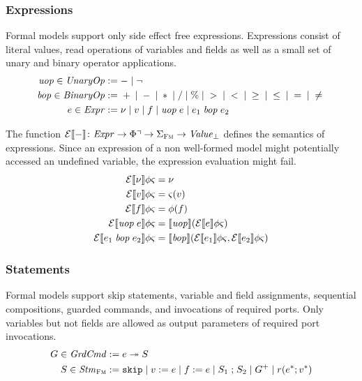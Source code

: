 \documentclass[a4paper,10pt,english]{article}
\begin{document}
\subsubsection{Expressions}
Formal models support only side effect free expressions. Expressions consist of literal values, read operations of variables
and fields as well as a small set of unary and binary operator applications.
\begin{align*}
	\mathit{uop} \in \mathit{UnaryOp} & := - \mid \neg
	\\
    \mathit{bop} \in \mathit{BinaryOp} & := {} + {} \mid {} - {} \mid {} \ast {} \mid {} / {}
                       \mid {} \% {} \mid {} > {} \mid {} < {} \mid {} \geq {} 
                       \mid {} \leq {} \mid {} = {} \mid {} \neq {}
	\\
	e \in \mathit{Expr} & := 
		\nu \mid
		v \mid
		f \mid 
		\mathit{uop}\; e \mid
		e_1 \;\mathit{bop}\; e_2
\end{align*}

The function $\mathcal{E} \llbracket - \rrbracket \colon \mathit{Expr} \rightarrow \Phi\urcorner \rightarrow \Sigma_\textsc{Fm} \rightarrow \mathit{Value}_\bot$ defines the
semantics of expressions. Since an expression of a non well-formed model might potentially accessed an undefined variable, the expression
evaluation might fail. 
\begin{align*}
	\mathcal{E} \llbracket \nu \rrbracket \phi \varsigma &= \nu \\
	\mathcal{E} \llbracket v \rrbracket \phi \varsigma &= \varsigma(v) \\
	\mathcal{E} \llbracket f \rrbracket \phi \varsigma &= \phi(f) \\
	\mathcal{E} \llbracket \mathit{uop}\; e \rrbracket \phi \varsigma &= \llbracket \mathit{uop} \rrbracket (\mathcal{E} \llbracket e \rrbracket \phi
	\varsigma) \\
	\mathcal{E} \llbracket e_1 \;\mathit{bop}\; e_2 \rrbracket \phi \varsigma &= \llbracket \mathit{bop} \rrbracket
	(\mathcal{E} \llbracket e_1 \rrbracket \phi \varsigma, \mathcal{E} \llbracket e_2 \rrbracket \phi \varsigma)
\end{align*}

\subsubsection{Statements}
Formal models support skip statements, variable and field assignments, sequential compositions, guarded commands, and
invocations of required ports. Only variables but not fields are allowed as output parameters of required port invocations.
\begin{align*}
	G \in \mathit{GrdCmd} &:= e \; \mathtt{\twoheadrightarrow} \; S \\
	S \in \mathit{Stm}_\textsc{Fm} &:=
		\mathtt{skip} \mid 
		v\; \mathtt{:=}\; e \mid
		f\; \mathtt{:=}\; e \mid
		S_1 \; \mathtt{;} \; S_2 \mid
		G^+ \mid
		r (e^*; v^*)
\end{align*}
\end{document}
